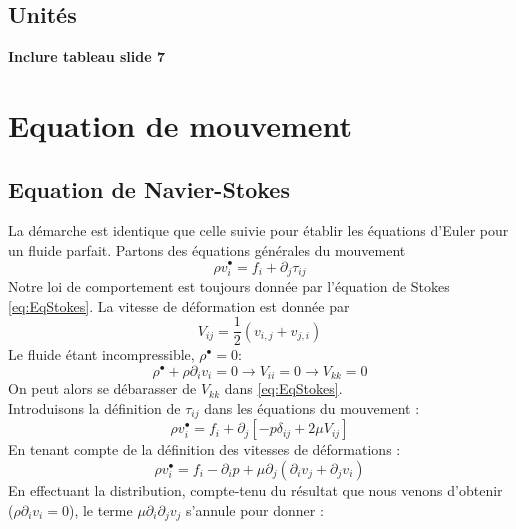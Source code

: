 \subsection{Unités}
\textbf{Inclure tableau slide 7}
	
\section{Equation de mouvement}
\subsection{Equation de Navier-Stokes}
La démarche est identique que celle suivie pour établir les équations d'Euler pour un
fluide parfait. Partons des équations générales du mouvement
\begin{equation}
	\rho v_i^\bullet = f_i + \partial_j \tau_{ij}
\end{equation}		
Notre loi de comportement est toujours donnée par l'équation de Stokes 
\autoref{eq:EqStokes}. La vitesse de déformation est donnée par 
\begin{equation}
	V_{ij} = \frac{1}{2}(v_{i,j} + v_{j,i})
\end{equation}
Le fluide étant incompressible, $\rho^\bullet = 0$:
\begin{equation}
	\rho^\bullet + \rho \partial_iv_i = 0 \rightarrow V_{ii} = 0 \rightarrow V_{kk}=0
\end{equation}
On peut alors se débarasser de $V_{kk}$ dans \autoref{eq:EqStokes}.\\
Introduisons la définition de $\tau_{ij}$ dans les équations du mouvement : 
\begin{equation}
	\rho v_i^\bullet = f_i + \partial_j[-p\delta_{ij} + 2\mu V_{ij}]
\end{equation}
En tenant compte de la définition des vitesses de déformations :
\begin{equation}
	\rho v_i^\bullet = f_i-\partial_i p + \mu\partial_j(\partial_iv_j+\partial_jv_i)
\end{equation}
En effectuant la distribution, compte-tenu du résultat que nous venons d'obtenir 
($\rho\partial_iv_i=0$), le terme $\mu\partial_i\partial_j v_j$ s'annule pour donner
:\\
	
	
